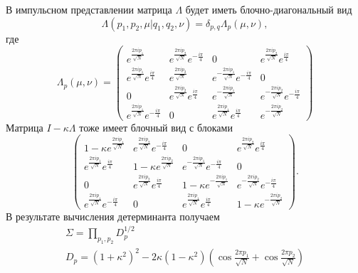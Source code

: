 \documentclass[a4paper,12pt]{article}
\theoremstyle{definition}
\theoremstyle{definition}
\theoremstyle{definition}
\begin{document}
В импульсном представлении матрица $\Lambda$ будет иметь блочно-диагональный вид
\begin{equation}
  \label{eq:129}
  \Lambda(p_1,p_2,\mu|q_1,q_2,\nu)=\delta_{p,q}\Lambda_p (\mu,\nu),
\end{equation}
где
\begin{equation}
  \label{eq:130}
  \Lambda_p(\mu,\nu)=
  \begin{pmatrix}
    e^{\frac{2\pi i p_1}{\sqrt N}} & e^{\frac{2\pi i p_2}{\sqrt N}} e^{-\frac{i\pi}{4}} & 0 & e^{\frac{2\pi i p_2}{\sqrt N}} e^{\frac{i\pi}{4}} \\
    e^{\frac{2\pi i p_1}{\sqrt N}} e^{\frac{i\pi}{4}} & e^{\frac{2\pi i p_2}{\sqrt N}} & e^{-\frac{2\pi i p_1}{\sqrt N}} e^{-\frac{i\pi}{4}} & 0 \\
    0 & e^{\frac{2\pi i p_2}{\sqrt N}} e^{\frac{i\pi}{4}} & e^{-\frac{2\pi i p_1}{\sqrt N}} & e^{-\frac{2\pi i p_2}{\sqrt N}} e^{-\frac{i\pi}{4}} \\
    e^{\frac{2\pi i p_1}{\sqrt N}} e^{-\frac{i\pi}{4}} & 0 & e^{\frac{2\pi i p_1}{\sqrt N}} e^{\frac{i\pi}{4}} & e^{-\frac{2\pi i p_2}{\sqrt N}}
  \end{pmatrix}
\end{equation}
Матрица $I-\kappa\Lambda$ тоже имеет блочный вид с блоками
\begin{equation}
  \label{eq:131}
  \begin{pmatrix}
    1-\kappa e^{\frac{2\pi i p_1}{\sqrt N}} & e^{\frac{2\pi i p_2}{\sqrt N}} e^{-\frac{i\pi}{4}} & 0 & e^{\frac{2\pi i p_2}{\sqrt N}} e^{\frac{i\pi}{4}} \\
    e^{\frac{2\pi i p_1}{\sqrt N}} e^{\frac{i\pi}{4}} & 1-\kappa e^{\frac{2\pi i p_2}{\sqrt N}} & e^{-\frac{2\pi i p_1}{\sqrt N}} e^{-\frac{i\pi}{4}} & 0 \\
    0 & e^{\frac{2\pi i p_2}{\sqrt N}} e^{\frac{i\pi}{4}} & 1-\kappa e^{-\frac{2\pi i p_1}{\sqrt N}} & e^{-\frac{2\pi i p_2}{\sqrt N}} e^{-\frac{i\pi}{4}} \\
    e^{\frac{2\pi i p_1}{\sqrt N}} e^{-\frac{i\pi}{4}} & 0 & e^{\frac{2\pi i p_1}{\sqrt N}} e^{\frac{i\pi}{4}} & 1- \kappa e^{-\frac{2\pi i p_2}{\sqrt N}}
  \end{pmatrix}.
\end{equation}
В результате вычисления детерминанта получаем
\begin{eqnarray}
  \label{eq:132}
  \Sigma=\prod_{p_1,p_2} D^{1/2}_{p}\\
  D_p=(1+\kappa^2)^2 -2\kappa (1-\kappa^2)\left( \cos \frac{2\pi p_1}{\sqrt N} +\cos \frac{2\pi p_2}{\sqrt N}\right)
\end{eqnarray}
\end{document}
